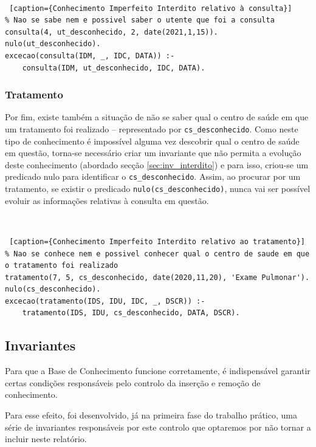 \documentclass[a4paper, 11pt]{article}
\begin{document}
\

\begin{lstlisting} [caption={Conhecimento Imperfeito Interdito relativo à consulta}]
% Nao se sabe nem e possivel saber o utente que foi a consulta
consulta(4, ut_desconhecido, 2, date(2021,1,15)).
nulo(ut_desconhecido).
excecao(consulta(IDM, _, IDC, DATA)) :-
    consulta(IDM, ut_desconhecido, IDC, DATA).
\end{lstlisting}

\subsubsection*{Tratamento}

Por fim, existe também a situação de não se saber qual o centro de saúde em que um tratamento 
foi realizado -- representado por \texttt{cs\_desconhecido}. Como neste tipo de conhecimento
é impossível alguma vez descobrir qual o centro de saúde em questão, torna-se necessário criar 
um invariante que não permita a evolução deste conhecimento (abordado secção 
\ref{sec:inv_interdito}) e para isso, criou-se um predicado nulo para identificar o 
\texttt{cs\_desconhecido}.
Assim, ao procurar por um tratamento, se existir o predicado \texttt{nulo(cs\_desconhecido)}, nunca 
vai ser
possível evoluir as informações relativas à consulta em questão.

\

\begin{lstlisting} [caption={Conhecimento Imperfeito Interdito relativo ao tratamento}]
% Nao se conhece nem e possivel conhecer qual o centro de saude em que o tratamento foi realizado
tratamento(7, 5, cs_desconhecido, date(2020,11,20), 'Exame Pulmonar').
nulo(cs_desconhecido).
excecao(tratamento(IDS, IDU, IDC, _, DSCR)) :-
    tratamento(IDS, IDU, cs_desconhecido, DATA, DSCR).
\end{lstlisting}

\pagebreak

\subsection{Invariantes}

Para que a Base de Conhecimento funcione corretamente, é indispensável garantir certas 
condições responsáveis pelo controlo da inserção e remoção de conhecimento.

Para esse efeito, foi desenvolvido, já na primeira fase do trabalho prático, uma série de 
invariantes responsáveis por este controlo que optaremos por não tornar a incluir neste 
relatório.
\end{document}
